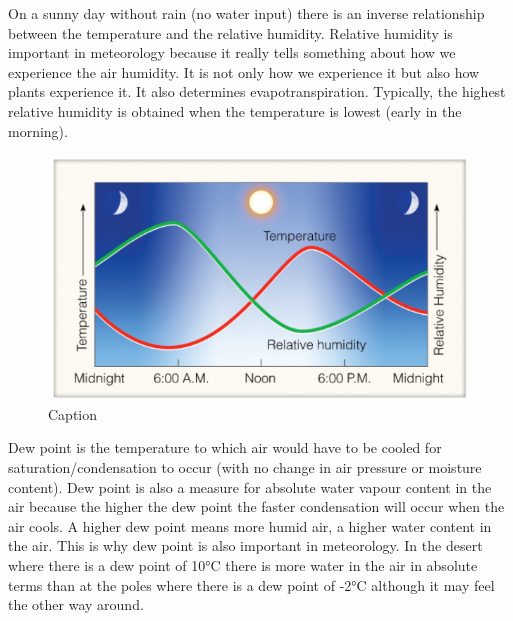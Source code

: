 \documentclass[12pt,oneside]{book}
\begin{document}
On a sunny day without rain (no water input) there is an inverse
relationship between the temperature and the relative humidity. Relative
humidity is important in meteorology because it really tells something
about how we experience the air humidity. It is not only how we
experience it but also how plants experience it. It also determines
evapotranspiration. Typically, the highest relative humidity is obtained
when the temperature is lowest (early in the morning).

\begin{figure}

{\centering \includegraphics[width=1\linewidth]{figures/Figure235} 

}

\caption{Caption}\label{fig:dewpoint}
\end{figure}

Dew point is the temperature to which air would have to be cooled for
saturation/condensation to occur (with no change in air pressure or
moisture content). Dew point is also a measure for absolute water vapour
content in the air because the higher the dew point the faster
condensation will occur when the air cools. A higher dew point means
more humid air, a higher water content in the air. This is why dew point
is also important in meteorology. In the desert where there is a dew
point of 10°C there is more water in the air in absolute terms than at
the poles where there is a dew point of -2°C although it may feel the
other way around.
\end{document}
